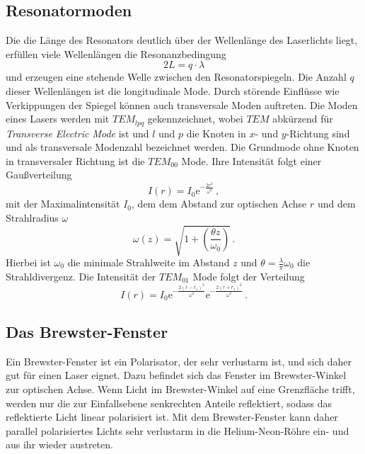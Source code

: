 \subsection*{Resonatormoden}
Die die Länge des Resonators deutlich über der Wellenlänge des Laserlichts liegt, erfüllen viele Wellenlängen die 
Resonanzbedingung 
\begin{equation*}
    2 L = q \cdot \lambda 
\end{equation*}
und erzeugen eine stehende Welle zwischen den Resonatorspiegeln. Die Anzahl $q$ dieser Wellenlängen ist die longitudinale
Mode. Durch störende Einflüsse wie Verkippungen der Spiegel können auch transversale Moden auftreten.
Die Moden eines Lasers werden mit $TEM_{lpq}$ gekennzeichnet, wobei $TEM$ abkürzend für \textit{Transverse Electric Mode} ist
und $l$ und $p$ die Knoten in $x$- und $y$-Richtung sind und als transversale Modenzahl bezeichnet werden.
Die Grundmode ohne Knoten in transversaler Richtung ist die $TEM_{00}$ Mode. Ihre Intensität folgt einer
Gaußverteilung
\begin{equation*}
    I \left(r\right) = I_0 \text{e}^{-\frac{2 r^2}{\omega^2}} \, ,
\end{equation*}
mit der Maximalintensität $I_0$, dem dem Abstand zur optischen Achse $r$ und dem Strahlradius $\omega$
\begin{equation*}
    \omega \left(z\right) = \sqrt{1 + \left(\frac{\theta z}{\omega_0}\right)} \, .
\end{equation*}
Hierbei ist $\omega_0$ die minimale Strahlweite im Abstand $z$ und $\theta = \frac{\lambda}{\pi} \omega_0$ die Strahldivergenz.
Die Intensität der $TEM_{01}$ Mode folgt der Verteilung
\begin{equation*}
    I \left(r\right) = I_0 \text{e}^{- \frac{2 \left(r - r_1\right)^2}{\omega^2}} \text{e}^{- \frac{2 \left(r + r_1\right)^2}{\omega^2}} \, .
\end{equation*}

\subsection*{Das Brewster-Fenster}
Ein Brewster-Fenster ist ein Polarisator, der sehr verlustarm ist, und sich daher gut für einen Laser eignet.
Dazu befindet sich das Fenster im Brewster-Winkel zur optischen Achse. Wenn Licht im Brewster-Winkel auf eine Grenzfläche
trifft, werden nur die zur Einfallsebene senkrechten Anteile reflektiert, sodass das reflektierte Licht linear polarisiert 
ist. Mit dem Brewster-Fenster kann daher parallel polarisiertes Lichts sehr verlustarm in die Helium-Neon-Röhre ein- und aus ihr wieder austreten.

